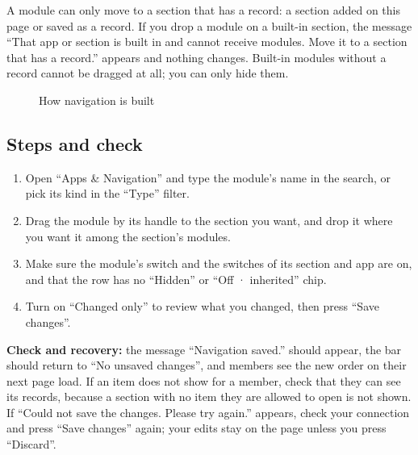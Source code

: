 \begin{rcwarn}
A module can only move to a section that has a record: a section added on this page or saved as a record. If you drop a module on a built-in section, the message “That app or section is built in and cannot receive modules. Move it to a section that has a record.” appears and nothing changes. Built-in modules without a record cannot be dragged at all; you can only hide them.
\end{rcwarn}

\begin{figure}[H]
\centering
{}
\rclegend
\caption{How navigation is built}
\label{fig:builder-navigation-tree}
\end{figure}

\subsection{Steps and check}
\begin{enumerate}
\item Open “Apps \& Navigation” and type the module's name in the search, or pick its kind in the “Type” filter.
\item Drag the module by its handle to the section you want, and drop it where you want it among the section's modules.
\item Make sure the module's switch and the switches of its section and app are on, and that the row has no “Hidden” or “Off · inherited” chip.
\item Turn on “Changed only” to review what you changed, then press “Save changes”.
\end{enumerate}

\textbf{Check and recovery:} the message “Navigation saved.” should appear, the bar should return to “No unsaved changes”, and members see the new order on their next page load. If an item does not show for a member, check that they can see its records, because a section with no item they are allowed to open is not shown. If “Could not save the changes. Please try again.” appears, check your connection and press “Save changes” again; your edits stay on the page unless you press “Discard”.

